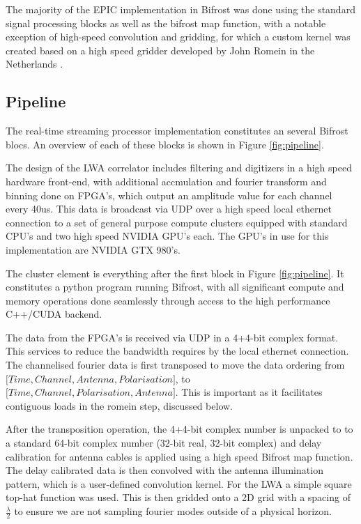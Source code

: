 \documentclass[bibliography=totocnumbered, twocolumn]{article}
\begin{document}
The majority of the EPIC implementation in Bifrost was done using the
standard signal processing blocks as well as the bifrost map function,
with a notable exception of high-speed convolution and gridding, for
which a custom kernel was created based on a high speed gridder
developed by John Romein in the Netherlands
\cite{romein_efficient_2012}.

\subsection{Pipeline}

The real-time streaming processor implementation constitutes an
several Bifrost blocs. An overview of each of these blocks is shown
in Figure \ref{fig:pipeline}.

The design of the LWA correlator includes filtering and digitizers in
a high speed hardware front-end, with additional accmulation and
fourier transform and binning done on FPGA's, which output an
amplitude value for each channel every 40us. This data is broadcast
via UDP over a high speed local ethernet connection to a set of
general purpose compute clusters equipped with standard CPU's and two
high speed NVIDIA GPU's each.  The GPU's in use for this
implementation are NVIDIA GTX 980's.

The cluster element is everything after the first block in Figure \ref{fig:pipeline}.
It constitutes a python program running Bifrost, with all significant
compute and memory operations done seamlessly through access to the
high performance C++/CUDA backend.

The data from the FPGA's is received via UDP in a 4+4-bit complex
format.  This services to reduce the bandwidth requires by the local
ethernet connection.  The channelised fourier data is first transposed
to move the data ordering from $\big[Time, Channel, Antenna,
Polarisation\big]$, to $\big[Time, Channel, Polarisation,
Antenna\big]$. This is important as it facilitates contiguous loads in
the romein step, discussed below.

After the transposition operation, the 4+4-bit complex number is
unpacked to to a standard 64-bit complex number (32-bit real, 32-bit complex)
and delay calibration for antenna cables is applied using a high
speed Bifrost map function. The delay calibrated data is then
convolved with the antenna illumination pattern, which is a user-defined
convolution kernel. For the LWA a simple square top-hat function was
used. This is then gridded onto a 2D grid with a spacing of $\frac{\lambda}{2}$
to ensure we are not sampling fourier modes outside of a physical horizon.
\end{document}
